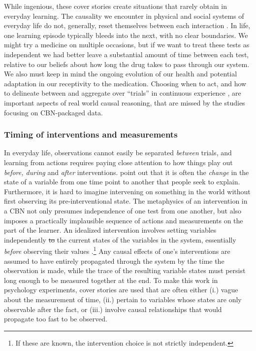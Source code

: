 \documentclass{cambridge7A}%
\newcommand{\ttodo}[2][]{\vspace{0.1cm} \hfil \todo[caption={\textbf{TG}}, size=\footnotesize, color = orange, inline, #1]{#2}}
\providecommand{\DIFadd}[1]{{\protect\color{blue}\uwave{#1}}} %
\providecommand{\DIFdel}[1]{{\protect\color{red}\sout{#1}}}                      %
\providecommand{\DIFaddbegin}{} %
\providecommand{\DIFaddend}{} %
\providecommand{\DIFdelbegin}{} %
\providecommand{\DIFdelend}{} %
\newcommand{\DIFscaledelfig}{0.5}
\newlength{\DIFdelgraphicswidth} %
\newlength{\DIFdelgraphicsheight} %
\newcommand{\DIFaddincludegraphics}[2][]{{\color{blue}\fbox{\DIFOincludegraphics[#1]{#2}}}} %
\newcommand{\DIFdelincludegraphics}[2][]{%
\sbox{\DIFdelgraphicsbox}{\DIFOincludegraphics[#1]{#2}}%
\settoboxwidth{\DIFdelgraphicswidth}{\DIFdelgraphicsbox} %
\settoboxtotalheight{\DIFdelgraphicsheight}{\DIFdelgraphicsbox} %
\scalebox{\DIFscaledelfig}{%
\parbox[b]{\DIFdelgraphicswidth}{\usebox{\DIFdelgraphicsbox}\\[-\baselineskip] \rule{\DIFdelgraphicswidth}{0em}}\llap{\resizebox{\DIFdelgraphicswidth}{\DIFdelgraphicsheight}{%
\setlength{\unitlength}{\DIFdelgraphicswidth}%
\begin{picture}(1,1)%
\thicklines\linethickness{2pt} %
{\color[rgb]{1,0,0}\put(0,0){\framebox(1,1){}}}%
{\color[rgb]{1,0,0}\put(0,0){\line( 1,1){1}}}%
{\color[rgb]{1,0,0}\put(0,1){\line(1,-1){1}}}%
\end{picture}%
}\hspace*{3pt}}} %
} %
\DeclareRobustCommand{\DIFaddbegin}{\DIFOaddbegin \let\includegraphics\DIFaddincludegraphics} %
\DeclareRobustCommand{\DIFaddend}{\DIFOaddend \let\includegraphics\DIFOincludegraphics} %
\DeclareRobustCommand{\DIFdelbegin}{\DIFOdelbegin \let\includegraphics\DIFdelincludegraphics} %
\DeclareRobustCommand{\DIFdelend}{\DIFOaddend \let\includegraphics\DIFOincludegraphics} %
\begin{document}
While ingenious, these cover stories create situations that rarely obtain in everyday learning.  The causality we encounter in physical and social systems of everyday life do not, generally, reset themselves between each interaction \citep{greville2007influence,rottman2016searching}.  In life, one learning episode typically bleeds into the next, with no clear boundaries.  We might try a medicine on multiple occasions, but if we want to treat these tests as independent we had better leave a substantial amount of time between each test, relative to our beliefs about how long the drug takes to pass through our system.  We also must keep in mind the ongoing evolution of our health and potential adaptation in our receptivity to the medication. Choosing when to act, and how to delineate between and aggregate over ``trials'' in continuous experience \citep[cf][]{tulving1972episodic,gallistel2000time}, are important aspects of real world causal reasoning, that are missed by the studies focusing on CBN-packaged data.


\subsubsection{Timing of interventions and measurements}

In everyday life, observations cannot easily be separated \emph{between} trials, and learning from actions requires paying close attention to how things play out \emph{before, during} and \emph{after} interventions.   \cite{rottman2012causal} point out that it is often the \emph{change} in the state of a variable from one time point to another that people seek to explain.  Furthermore, it is hard to imagine intervening on something in the world without first observing its pre-interventional state.  The metaphysics of an intervention in a CBN not only presumes independence of one test from one another, but also imposes a practically implausible sequence of actions and measurements on the part of the learner.  An idealized intervention involves setting variables independently \DIFdelbegin \DIFdel{to }\DIFdelend \DIFaddbegin \DIFadd{from }\DIFaddend the current states of the variables in the system, essentially \emph{before} observing their values \citep{pearl2000causality}.\footnote{If these are known, the intervention choice is not strictly independent.} \DIFaddbegin \ttodo{i would remove the footnote}  \DIFaddend Any causal effects of one's interventions are assumed to have entirely propagated through the system by the time the observation is made, while the trace of the resulting variable states must persist long enough to be measured together at the end.  
To make this work in psychology experiments, cover stories are used that are often either (i.) vague about the measurement of time, (ii.) pertain to variables whose states are only observable after the fact, or (iii.) involve causal relationships that would propagate too fast to be observed.  
\end{document}
